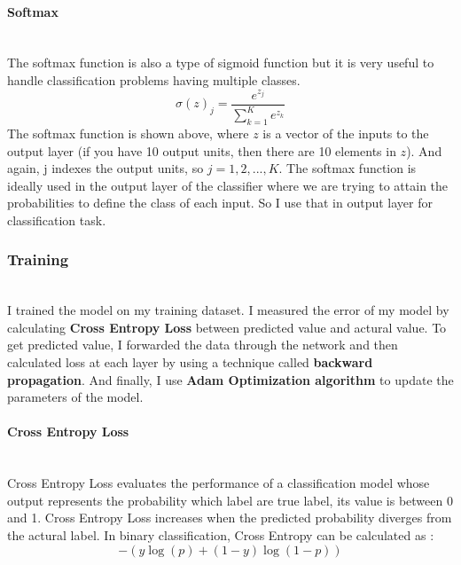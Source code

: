 \documentclass[runningheads]{llncs}
\begin{document}
\paragraph{\bf Softmax}\hspace*{\fill} \\
The softmax function is also a type of sigmoid function but it is very useful to handle classification problems having multiple classes. 
\begin{equation}
\sigma(z)_{j}=\frac{e^{z_{j}}}{\sum_{k=1}^{K} e^{z_{k}}}
\end{equation}
The softmax function is shown above, where $z$ is a vector of the inputs to the output layer (if you have 10 output units, then there are 10 elements in $z$). And again, j indexes the output units, so $j = 1, 2, ..., K$. The softmax function is ideally used in the output layer of the classifier where we are trying to attain the probabilities to define the class of each input\cite{cnn_project}. So I use that in output layer for classification task.

\subsubsection{Training}\hspace*{\fill} \\
I trained the model on my training dataset. I measured the error of my model by calculating \textbf{Cross Entropy Loss} between predicted value and actural value. To get predicted value, I forwarded the data through the network and then calculated loss at each layer by using a technique called \textbf{backward propagation}. And finally, I use \textbf{Adam Optimization algorithm} to update the parameters of the model.

\paragraph{\large\bf Cross Entropy Loss}\hspace*{\fill} \\
Cross Entropy Loss evaluates the performance of a classification model whose output represents the probability which label are true label, its value is between 0 and 1. Cross Entropy Loss increases when the predicted probability diverges from the actural label. In binary classification, Cross Entropy can be calculated as :
\begin{equation}
-(y \log (p)+(1-y) \log (1-p))
\end{equation}
\end{document}
